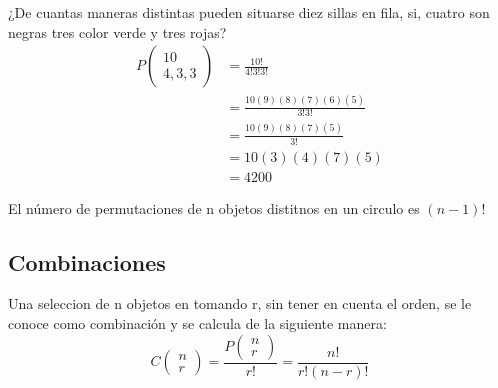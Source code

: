 \begin{ejemplo}
    ¿De cuantas maneras distintas pueden situarse diez sillas en fila, si, cuatro son negras tres color verde y tres rojas?
    \begin{align*}
        P\left(\begin{matrix}
                10 \\
                4,3,3
            \end{matrix}\right) & = \frac{10!}{4!3!3!}             \\
                                                & = \frac{10(9)(8)(7)(6)(5)}{3!3!} \\
                                                & = \frac{10(9)(8)(7)(5)}{3!}      \\
                                                & = 10(3)(4)(7)(5)                 \\
                                                & =4200
    \end{align*}
\end{ejemplo}
\begin{teorema}
    El número de permutaciones de n objetos distitnos en un circulo es $(n-1)!$
\end{teorema}
\subsection{Combinaciones}
Una seleccion de n objetos en tomando r, sin tener en cuenta el orden, se le conoce como combinación y se calcula de la siguiente manera:
\begin{equation*}
    C\left(\begin{matrix}
            n \\
            r
        \end{matrix}\right) = \frac{P\left(\begin{matrix}
            n \\
            r
        \end{matrix}\right)}{r!} = \frac{n!}{r!(n-r)!}
\end{equation*}